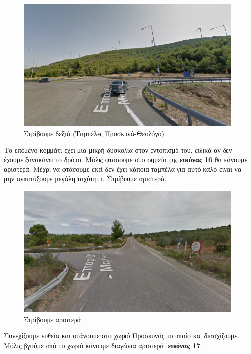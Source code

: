 \begin{figure}[hbp!]
	\centering
		\includegraphics[width=\textwidth]{images/athina-lamia/tragana/tragana3.PNG}
			\caption{Στρίβουμε δεξιά (Ταμπέλες Προσκυνά-Θεολόγο)}
\end{figure}
Το επόμενο κομμάτι έχει μια μικρή δυσκολία στον εντοπισμό του, ειδικά αν δεν έχουμε ξανακάνει το δρόμο. Μόλις φτάσουμε στο σημείο της \textbf{εικόνας 16} θα κάνουμε αριστερά. Μέχρι να φτάσουμε εκεί δεν έχει κάποια ταμπέλα για αυτό καλό είναι να μην αναπτύξουμε μεγάλη ταχύτητα. Στρίβουμε αριστερά.
\begin{figure}[hbp!]
	\centering
		\includegraphics[width=\textwidth]{images/athina-lamia/tragana/tragana4.PNG}
			\caption{Στρίβουμε αριστερά}
\end{figure}
\newpage
Συνεχίζουμε ευθεία και φτάνουμε στο χωριό Προσκυνάς το οποίο και διασχίζουμε. Μόλις βγούμε από το χωριό κάνουμε διαγώνια αριστερά [\textbf{εικόνας 17}].
